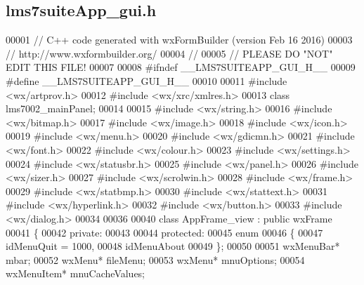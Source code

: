 \subsection{lms7suite\+App\+\_\+gui.\+h}
\label{lms7suiteApp__gui_8h_source}

\begin{DoxyCode}
00001 \textcolor{comment}{// C++ code generated with wxFormBuilder (version Feb 16 2016)}
00003 \textcolor{comment}{// http://www.wxformbuilder.org/}
00004 \textcolor{comment}{//}
00005 \textcolor{comment}{// PLEASE DO "NOT" EDIT THIS FILE!}
00007 \textcolor{comment}{}
00008 \textcolor{preprocessor}{#ifndef \_\_LMS7SUITEAPP\_GUI\_H\_\_}
00009 \textcolor{preprocessor}{#define \_\_LMS7SUITEAPP\_GUI\_H\_\_}
00010 
00011 \textcolor{preprocessor}{#include <wx/artprov.h>}
00012 \textcolor{preprocessor}{#include <wx/xrc/xmlres.h>}
00013 \textcolor{keyword}{class }lms7002_mainPanel;
00014 
00015 \textcolor{preprocessor}{#include <wx/string.h>}
00016 \textcolor{preprocessor}{#include <wx/bitmap.h>}
00017 \textcolor{preprocessor}{#include <wx/image.h>}
00018 \textcolor{preprocessor}{#include <wx/icon.h>}
00019 \textcolor{preprocessor}{#include <wx/menu.h>}
00020 \textcolor{preprocessor}{#include <wx/gdicmn.h>}
00021 \textcolor{preprocessor}{#include <wx/font.h>}
00022 \textcolor{preprocessor}{#include <wx/colour.h>}
00023 \textcolor{preprocessor}{#include <wx/settings.h>}
00024 \textcolor{preprocessor}{#include <wx/statusbr.h>}
00025 \textcolor{preprocessor}{#include <wx/panel.h>}
00026 \textcolor{preprocessor}{#include <wx/sizer.h>}
00027 \textcolor{preprocessor}{#include <wx/scrolwin.h>}
00028 \textcolor{preprocessor}{#include <wx/frame.h>}
00029 \textcolor{preprocessor}{#include <wx/statbmp.h>}
00030 \textcolor{preprocessor}{#include <wx/stattext.h>}
00031 \textcolor{preprocessor}{#include <wx/hyperlink.h>}
00032 \textcolor{preprocessor}{#include <wx/button.h>}
00033 \textcolor{preprocessor}{#include <wx/dialog.h>}
00034 
00036 
00040 \textcolor{keyword}{class }AppFrame_view : \textcolor{keyword}{public} wxFrame 
00041 \{
00042     \textcolor{keyword}{private}:
00043     
00044     \textcolor{keyword}{protected}:
00045         \textcolor{keyword}{enum}
00046         \{
00047             idMenuQuit = 1000,
00048             idMenuAbout
00049         \};
00050         
00051         wxMenuBar* mbar;
00052         wxMenu* fileMenu;
00053         wxMenu* mnuOptions;
00054         wxMenuItem* mnuCacheValues;

\end{DoxyCode}
